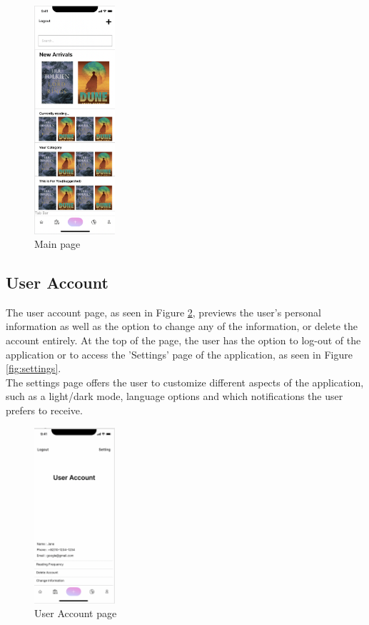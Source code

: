 \documentclass[conference]{IEEEtran}
\begin{document}
\begin{figure}[h]
    \centering
    \includegraphics[width=3cm]{Ressources/Specifications/mainpage.png}
    \caption{Main page}
    \label{fig:mainpage}
\end{figure}

\subsection{User Account}
The user account page, as seen in Figure \ref{fig:useracc}, previews the user's personal information as well as the option to change any of the information, or delete the account entirely. At the top of the page, the user has the option to log-out of the application or to access the 'Settings' page of the application, as seen in Figure \ref{fig:settings}. \\

The settings page offers the user to customize different aspects of the application, such as a light/dark mode, language options and which notifications the user prefers to receive.


\begin{figure}[h]
    \centering
    \includegraphics[width=3cm]{Ressources/Specifications/useracc.png}
    \caption{User Account page}
    \label{fig:useracc}
\end{figure}
\end{document}
